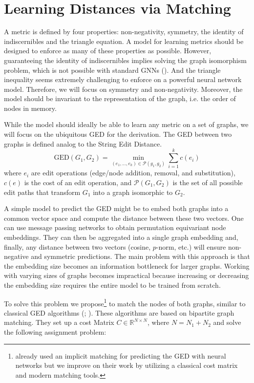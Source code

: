 \section{Learning Distances via Matching}

A metric is defined by four properties: non-negativity, symmetry, the identity of indiscernibles and the triangle equation. A model for learning metrics should be designed to enforce as many of these properties as possible. However, guaranteeing the identity of indiscernibles implies solving the graph isomorphism problem, which is not possible with standard GNNs (\citealp{gin2019}). And the triangle inequality seems extremely challenging to enforce on a powerful neural network model. Therefore, we will focus on symmetry and non-negativity. Moreover, the model should be invariant to the representation of the graph, i.e. the order of nodes in memory.

While the model should ideally be able to learn any metric on a set of graphs, we will focus on the ubiquitous GED for the derivation. The GED between two graphs is defined analog to the String Edit Distance.
\begin{equation}
     \text{GED}(G_{1},G_{2}) = \min_{(e_{1},...,e_{k}) \in \mathcal{P}(g_{1},g_{2})} \sum_{i=1}^{k} c(e_{i})
\end{equation}
where $e_{i}$ are edit operations (edge/node addition, removal, and substitution), $c(e)$ is the cost of an edit operation, and $\mathcal{P}(G_{1},G_{2})$ is the set of all possible edit paths that transform $G_{1}$ into a graph isomorphic to $G_{2}$.

A simple model to predict the GED might be to embed both graphs into a common vector space and compute the distance between these two vectors. One can use message passing networks to obtain permutation equivariant node embeddings. They can then be aggregated into a single graph embedding and, finally, any distance between two vectors (cosine, $p$-norm, etc.) will ensure non-negative and symmetric predictions. The main problem with this approach is that the embedding size becomes an information bottleneck for larger graphs. Working with varying sizes of graphs becomes impractical because increasing or decreasing the embedding size requires the entire model to be trained from scratch.

To solve this problem we propose\footnote{\cite{riba2018} already used an implicit matching for predicting the GED with neural networks but we improve on their work by utilizing a classical cost matrix and modern matching tools.} to match the nodes of both graphs, similar to classical GED algorithms (\citealp{hungarian2009}; \citealp{frankhauser2011}). These algorithms are based on bipartite graph matching. They set up a cost Matrix $C \in \mathbb{R}^{N \times N}$, where $N = N_1 + N_2$ and solve the following assignment problem:

